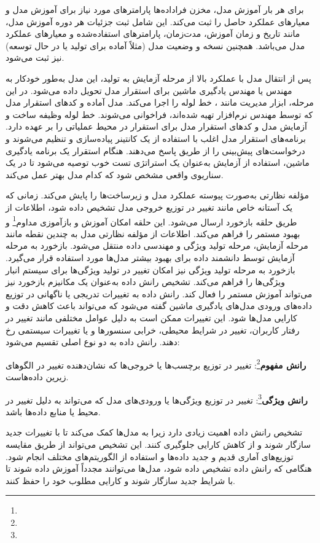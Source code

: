 برای هر بار آموزش مدل، مخزن فراداده‌ها پارامترهای مورد نیاز برای آموزش مدل و معیارهای عملکرد حاصل را ثبت می‌کند. این شامل ثبت جزئیات هر دوره آموزش مدل، مانند تاریخ و زمان آموزش، مدت‌زمان، پارامترهای استفاده‌شده و معیارهای عملکرد مدل می‌باشد. همچنین نسخه و وضعیت مدل (مثلاً آماده برای تولید یا در حال توسعه) نیز ثبت می‌شود.

پس از انتقال مدل با عملکرد بالا از مرحله آزمایش به تولید، این مدل به‌طور خودکار به مهندس  یا مهندس یادگیری ماشین برای استقرار مدل تحویل داده می‌شود. در این مرحله، ابزار مدیریت  مانند ، خط لوله  را اجرا می‌کند. مدل آماده و کدهای استقرار مدل که توسط مهندس نرم‌افزار تهیه شده‌اند، فراخوانی می‌شوند. خط لوله  وظیفه ساخت و آزمایش مدل و کدهای استقرار مدل برای استقرار در محیط عملیاتی را بر عهده دارد. برنامه‌های استقرار مدل اغلب با استفاده از یک کانتینر پیاده‌سازی و تنظیم می‌شوند و درخواست‌های پیش‌بینی را از طریق  پاسخ می‌دهند. هنگام استقرار یک برنامه یادگیری ماشین، استفاده از آزمایش  به‌عنوان یک استراتژی تست خوب توصیه می‌شود تا در یک سناریوی واقعی مشخص شود که کدام مدل بهتر عمل می‌کند.

مؤلفه نظارتی به‌صورت پیوسته عملکرد مدل و زیرساخت‌ها را پایش می‌کند. زمانی که یک آستانه خاص مانند تغییر در توزیع خروجی مدل تشخیص داده شود، اطلاعات از طریق حلقه بازخورد ارسال می‌شود. این حلقه امکان آموزش و بازآموزی مداوم\footnote{} و بهبود مستمر را فراهم می‌کند. اطلاعات از مؤلفه نظارتی مدل به چندین نقطه مانند مرحله آزمایش، مرحله تولید ویژگی و مهندسی داده منتقل می‌شود. بازخورد به مرحله آزمایش توسط دانشمند داده برای بهبود بیشتر مدل‌ها مورد استفاده قرار می‌گیرد. بازخورد به مرحله تولید ویژگی نیز امکان تغییر در تولید ویژگی‌ها برای سیستم انبار ویژگی‌ها را فراهم می‌کند. تشخیص رانش داده به‌عنوان یک مکانیزم بازخورد نیز می‌تواند آموزش مستمر را فعال کند. رانش داده به تغییرات تدریجی یا ناگهانی در توزیع داده‌های ورودی مدل‌های یادگیری ماشین گفته می‌شود که می‌تواند باعث کاهش دقت و کارایی مدل‌ها شود. این تغییرات ممکن است به دلیل عوامل مختلفی مانند تغییر در رفتار کاربران، تغییر در شرایط محیطی، خرابی سنسورها و یا تغییرات سیستمی رخ دهند. رانش داده به دو نوع اصلی تقسیم می‌شود:

\textbf{رانش مفهوم}\footnote{}:
تغییر در توزیع برچسب‌ها یا خروجی‌ها که نشان‌دهنده تغییر در الگوهای زیرین داده‌هاست.

\textbf{رانش ویژگی}\footnote{}:
تغییر در توزیع ویژگی‌ها یا ورودی‌های مدل که می‌تواند به دلیل تغییر در محیط یا منابع داده‌ها باشد.

تشخیص رانش داده اهمیت زیادی دارد زیرا به مدل‌ها کمک می‌کند تا با تغییرات جدید سازگار شوند و از کاهش کارایی جلوگیری کنند. این تشخیص می‌تواند از طریق مقایسه توزیع‌های آماری قدیم و جدید داده‌ها و استفاده از الگوریتم‌های مختلف انجام شود. هنگامی که رانش داده تشخیص داده شود، مدل‌ها می‌توانند مجدداً آموزش داده شوند تا با شرایط جدید سازگار شوند و کارایی مطلوب خود را حفظ کنند.

